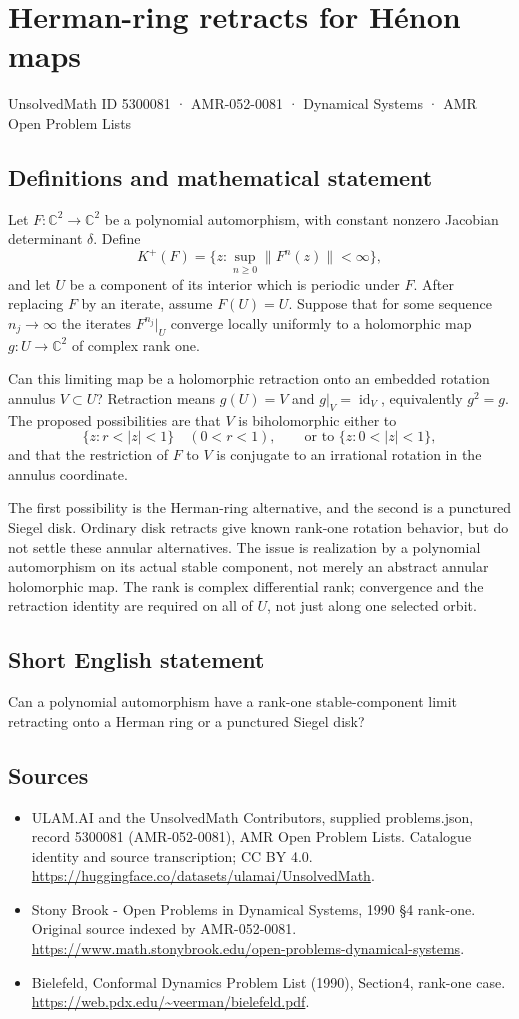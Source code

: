 \documentclass[11pt,a4paper]{article}
\begin{document}
\section*{Herman-ring retracts for Hénon maps}\label{5300081}
{\small UnsolvedMath ID 5300081 · AMR-052-0081 · Dynamical Systems · AMR Open Problem Lists}
\subsection{Definitions and mathematical statement}
Let $F:\mathbb C^2\to\mathbb C^2$ be a polynomial automorphism,
with constant nonzero Jacobian determinant $\delta$. Define
\[
 K^+(F)=\{z:\sup_{n\ge0}\|F^n(z)\|<\infty\},
\]
and let $U$ be a component of its interior which is periodic under
$F$. After replacing $F$ by an iterate, assume $F(U)=U$.
Suppose that for some sequence $n_j\to\infty$ the iterates
$F^{n_j}|_U$ converge locally uniformly to a holomorphic map
$g:U\to\mathbb C^2$ of complex rank one.

Can this limiting map be a holomorphic retraction onto an embedded
rotation annulus $V\subset U$? Retraction means $g(U)=V$ and
$g|_V=\operatorname{id}_V$, equivalently $g^2=g$. The proposed
possibilities are that $V$ is biholomorphic either to
\[
 \{z:r<|z|<1\}\quad(0<r<1),
 \qquad\text{or to }\{z:0<|z|<1\},
\]
and that the restriction of $F$ to $V$ is conjugate to an irrational
rotation in the annulus coordinate.

The first possibility is the Herman-ring alternative, and the
second is a punctured Siegel disk. Ordinary disk retracts give
known rank-one rotation behavior, but do not settle these annular
alternatives. The issue is realization by a polynomial automorphism
on its actual stable component, not merely an abstract annular
holomorphic map. The rank is complex differential rank; convergence
and the retraction identity are required on all of $U$, not just
along one selected orbit.
\subsection{Short English statement}
Can a polynomial automorphism have a rank-one stable-component limit retracting onto a Herman ring or a punctured Siegel disk?
\subsection{Sources}
\begin{itemize}
\item[S1] ULAM.AI and the UnsolvedMath Contributors, supplied problems.json, record 5300081 (AMR-052-0081), AMR Open Problem Lists. Catalogue identity and source transcription; CC BY 4.0.
\url{https://huggingface.co/datasets/ulamai/UnsolvedMath}.
\item[S2] Stony Brook - Open Problems in Dynamical Systems, 1990 §4 rank-one. Original source indexed by AMR-052-0081.
\url{https://www.math.stonybrook.edu/open-problems-dynamical-systems}.
\item[S3] Bielefeld, Conformal Dynamics Problem List (1990), Section4, rank-one case.
\url{https://web.pdx.edu/~veerman/bielefeld.pdf}.
\end{itemize}
\end{document}
